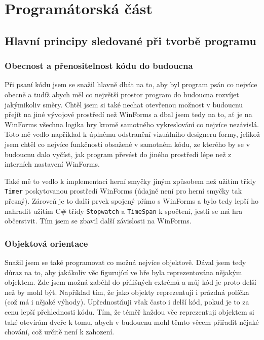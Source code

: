 \documentclass[a4]{article}
\begin{document}
\section{Programátorská část}
\subsection{Hlavní principy sledované při tvorbě programu}
\subsubsection{Obecnost a přenositelnost kódu do budoucna}
Při psaní kódu jsem se snažil hlavně dbát na to, aby byl program psán co nejvíce obecně a tudíž abych měl co největší prostor program do budoucna rozvíjet jakýmikoliv směry. Chtěl jsem si také nechat otevřenou možnost v budoucnu přejít na jiné vývojové prostředí než WinForms a dbal jsem tedy na to, ať je na WinForms všechna logika hry kromě samotného vykreslování co nejvíce nezávislá. Toto mě vedlo například k úplnému odstranění vizuálního designeru formy, jelikož jsem chtěl co nejvíce funkčnosti obsažené v samotném kódu, ze kterého by se v budoucnu dalo vyčíst, jak program převést do jiného prostředí lépe než z interních nastavení WinForms.

Také mě to vedlo k implementaci herní smyčky jiným způsobem než užitím třídy \verb|Timer| poskytovanou prostředí WinForms (údajně není pro herní smyčky tak přesný). Zároveň je to další prvek spojený přímo s WinForms a bylo tedy lepší ho nahradit užitím C\# třídy \verb|Stopwatch| a \verb|TimeSpan| k spočtení, jestli se má hra občerstvit. Tím jsem se zbavil další závislosti na WinForms.
\subsubsection{Objektová orientace}
Snažil jsem se také programovat co možná nejvíce objektově. Dával jsem tedy důraz na to, aby jakákoliv věc figurující ve hře byla reprezentována nějakým objektem. Zde jsem možná zaběhl do přílišných extrémů a můj kód je proto delší než by mohl být. Například tím, že jako objekty reprezentuji i prázdná políčka (což má i nějaké výhody). Upřednostňuji však často i delší kód, pokud je to za cenu lepší přehlednosti kódu. Tím, že téměř každou věc reprezentuji objektem si také otevírám dveře k tomu, abych v budoucnu mohl těmto věcem přiřadit nějaké chování, což určitě není k zahození.
\end{document}
